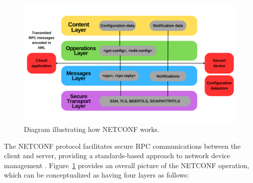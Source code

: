 \begin{figure}[!]
    \centering
    \includegraphics[width=\linewidth]{Images/network_configuration_protocol-f_mobile.png}
    \caption{Diagram illustrating how NETCONF works.}
    \label{mio}
\end{figure}

The NETCONF protocol facilitates secure RPC communications between the client and server, providing a standards-based approach to network device management \cite{techtarget}. Figure~\ref{mio} provides an overall picture of the NETCONF operation, which can be conceptualized as having four layers as follows:


